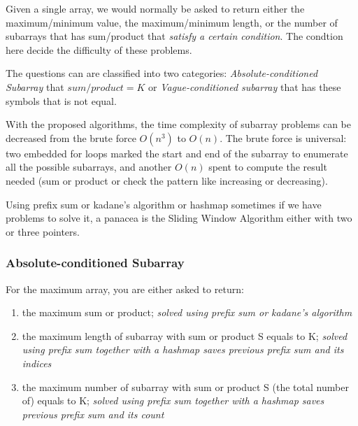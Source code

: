 \documentclass[../specific-algorithms.tex]{subfiles}
\begin{document}
Given a single array, we would normally be asked to return either the maximum/minimum value, the maximum/minimum length, or the number of subarrays that has sum/product that \textit{satisfy a certain condition}. The condtion here decide the difficulty of these problems.

The questions can are classified into two categories: \textit{Absolute-conditioned Subarray} that $sum/product=K$ or \textit{Vague-conditioned subarray} that has these symbols that is not equal. 


With the proposed algorithms, the time complexity of subarray problems can be decreased from the brute force $O(n^3)$ to $O(n)$. The brute force is universal: two embedded for loops marked the start and end of the subarray to enumerate all the possible subarrays, and another $O(n)$ spent to compute the result needed (sum or product or check the pattern like increasing or decreasing). 

Using prefix sum or kadane's algorithm or hashmap sometimes if we have problems to solve it, a panacea is the Sliding Window Algorithm either with two or three pointers. 
\subsubsection{Absolute-conditioned Subarray}
For the maximum array, you are either asked to return: 
\begin{enumerate}
\item the maximum sum or product; \textit{solved using prefix sum or kadane's algorithm}
\item the maximum length of subarray with sum or product S equals to K; \textit{solved using prefix sum together with a hashmap saves previous prefix sum and its indices}
\item the maximum number of subarray with sum or product S (the total number of) equals to K; \textit{solved using prefix sum together with a hashmap saves previous prefix sum and its count}
\end{enumerate}
\end{document}
